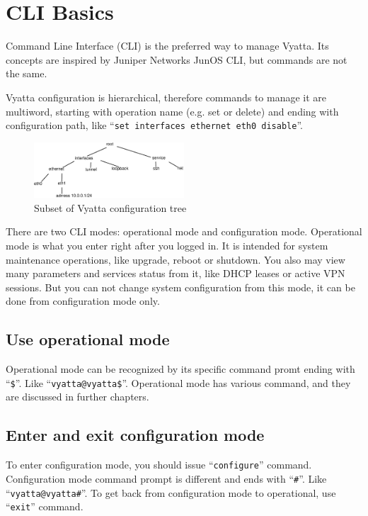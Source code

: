 \chapter{CLI Basics}
Command Line Interface (CLI) is the preferred way to manage Vyatta. Its concepts are inspired by Juniper Networks
JunOS CLI, but commands are not the same.

Vyatta configuration is hierarchical, therefore commands to manage it are multiword, starting with operation name 
(e.g. set or delete) and ending with configuration path, like ``\texttt{set interfaces ethernet eth0 disable}''.

\begin{figure}[hc]
 \begin{center}
   \includegraphics[width=0.5\textwidth]{images/config_tree.eps}
   \caption{Subset of Vyatta configuration tree}
  \end{center}
\end{figure}


There are two CLI modes: operational mode and configuration mode. Operational mode is what you enter right after
you logged in. It is intended for system maintenance operations, like upgrade, reboot or shutdown. You also may view
many parameters and services status from it, like DHCP leases or active VPN sessions. But you can not change system
configuration from this mode, it can be done from configuration mode only.

\section{Use operational mode}
Operational mode can be recognized by its specific command promt ending with ``\texttt{\$}''.
Like ``\texttt{vyatta@vyatta\$}''. Operational mode has various command, and they are discussed in further chapters.

\section{Enter  and exit configuration mode}
To enter configuration mode, you should issue ``\texttt{configure}'' command. Configuration mode command prompt is
different and ends with ``\texttt{\#}''. Like ``\texttt{vyatta@vyatta\#}''. To get back from configuration mode to
operational, use ``\texttt{exit}'' command.

